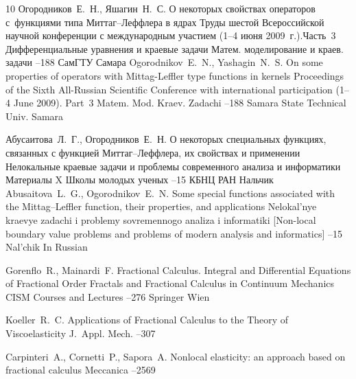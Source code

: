 \begin{thebibliography}{10}
\by Огородников~Е.~Н., Яшагин~Н.~С.
\paper О некоторых свойствах операторов с~функциями типа Миттаг--Леффлера в ядрах
\inbook Труды шестой Всероссийской научной конференции с международным участием \rm (1--4 июня 2009~г.).Часть~3
\bookinfo Дифференциальные уравнения и краевые задачи
\serial Матем. моделирование и краев. задачи
--188
\publ СамГТУ
\publaddr Самара
\misctransl
\by Ogorodnikov~E.~N., Yashagin~N.~S.
\paper On some properties of operators with Mittag-Leffler type functions in kernels
\inbook Proceedings of the Sixth All-Russian Scientific Conference with international participation \rm (1--4 June 2009). Part~3
\serial Matem. Mod. Kraev. Zadachi
--188
\publ Samara State Technical Univ.
\publaddr Samara


\by Абусаитова~Л.~Г., Огородников~Е.~Н.
\paper О некоторых специальных функциях, связанных с функцией Миттаг--Леффлера, их свойствах и применении
\inbook Нелокальные краевые задачи и проблемы современного анализа и информатики
\bookinfo Материалы X Школы молодых ученых
--15
\publ КБНЦ РАН
\publaddr Нальчик
\misctransl
\by Abusaitova~L.~G., Ogorodnikov~E.~N.
\paper Some special functions associated with the Mittag--Leffler function, their properties, and applications
\inbook Nelokal'nye kraevye zadachi i problemy sovremennogo analiza i informatiki \rm [Non-local boundary value problems and problems of modern analysis and informatics]
--15
\publaddr Nal'chik
\lang In Russian


\by Gorenflo~R., Mainardi~F.
\paper Fractional Calculus. Integral and Differential Equations of Fractional Order
\inbook Fractals and Fractional Calculus in Continuum Mechanics
\serial CISM Courses and Lectures
--276
\publ Springer
\publaddr Wien

\by Koeller~R.~C.
\paper Applications of Fractional Calculus to the Theory of Viscoelasticity
\jour J.~Appl. Mech.
--307

\by Carpinteri~A., Cornetti~P., Sapora~A.
\paper Nonlocal elasticity: an approach based on fractional calculus
\jour Meccanica
--2569


\end{thebibliography}

